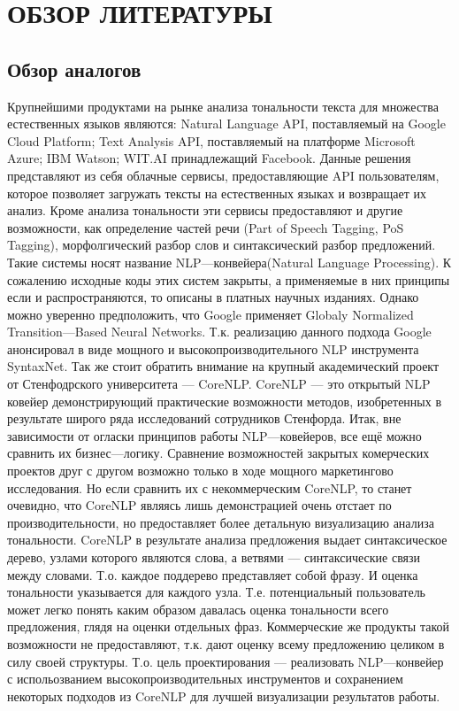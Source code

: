 \section{ОБЗОР ЛИТЕРАТУРЫ}
\label{sec:domain}
\subsection{Обзор аналогов}
\label{sub:domain:overview_analogue}
Крупнейшими продуктами на рынке анализа тональности текста для множества естественных языков являются: Natural Language API, поставляемый на Google Cloud Platform; Text Analysis API, поставляемый на платформе Microsoft Azure; IBM Watson; WIT.AI принадлежащий Facebook. Данные решения представляют из себя облачные сервисы, предоставляющие API пользователям, которое позволяет загружать тексты на естественных языках и возвращает их анализ. Кроме анализа тональности эти сервисы предоставляют и другие возможности, как определение частей речи (Part of Speech Tagging, PoS Tagging), морфолгический разбор слов и синтаксический разбор предложений. Такие системы носят название NLP—конвейера(Natural Language Processing). К сожалению исходные коды этих систем закрыты, а применяемые в них принципы если и распространяются, то описаны в платных научных изданиях. Однако можно уверенно предположить, что Google применяет Globaly Normalized Transition—Based Neural Networks\cite{google_gntb}. Т.к. реализацию  данного подхода Google анонсировал в виде мощного и высокопроизводительного NLP инструмента SyntaxNet.
Так же стоит обратить внимание на крупный академический проект от Стенфодрского университета — CoreNLP. CoreNLP — это открытый NLP ковейер демонстрирующий практические возможности методов, изобретенных в результате широго ряда исследований сотрудников Стенфорда.
Итак, вне зависимости от огласки принципов работы NLP—ковейеров, все ещё можно сравнить их бизнес—логику. Сравнение возможностей закрытых комерческих проектов друг с другом возможно только в ходе мощного маркетингово исследования. Но если сравнить их с некоммерческим CoreNLP, то станет очевидно, что CoreNLP являясь лишь демонстрацией очень отстает по производительности, но предоставляет более детальную визуализацию анализа тональности. CoreNLP в результате анализа предложения выдает синтаксическое дерево, узлами которого являются слова, а ветвями — синтаксические связи между словами. Т.о. каждое поддерево представляет собой фразу. И оценка тональности указывается для каждого узла. Т.е. потенциальный пользователь может легко понять каким образом давалась оценка тональности всего предложения, глядя на оценки отдельных фраз. Коммерческие же продукты такой возможности не предоставляют, т.к. дают оценку всему предложению целиком в силу своей структуры.
Т.о. цель проектирования — реализовать NLP—конвейер с испольозванием высокопроизводительных инструментов и сохранением некоторых подходов из CoreNLP для лучшей визуализации результатов работы.
